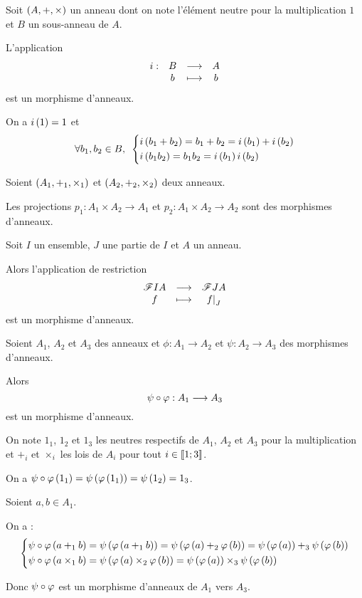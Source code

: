 \begin{prop}
Soit \(\anneau{A}\) un anneau dont on note l'élément neutre pour la multiplication \(1\) et \(B\) un sous-anneau de \(A\).

L'application \[\begin{array}[t]{cccc}i : & B & \longrightarrow & A \\ & b & \longmapsto & b\end{array}\] est un morphisme d'anneaux.
\end{prop}

\begin{dem}
On a \(i\left(1\right)=1\) et \[\quantifs{\forall b_1,b_2\in B}\begin{dcases}i\paren{b_1+b_2}=b_1+b_2=i\paren{b_1}+i\paren{b_2} \\ i\paren{b_1b_2}=b_1b_2=i\paren{b_1}i\paren{b_2}\end{dcases}\]
\end{dem}

\begin{ex}
Soient \(\anneau{A_1}[+_1][\times_1]\) et \(\anneau{A_2}[+_2][\times_2]\) deux anneaux.

Les projections \(p_1:A_1\times A_2\to A_1\) et \(p_2:A_1\times A_2\to A_2\) sont des morphismes d'anneaux.
\end{ex}

\begin{ex}
Soit \(I\) un ensemble, \(J\) une partie de \(I\) et \(A\) un anneau.

Alors l'application de restriction \[\fonctionlambda{\F{I}{A}}{\F{J}{A}}{f}{\restr{f}{J}}\] est un morphisme d'anneaux.
\end{ex}

\begin{prop}
Soient \(A_1\), \(A_2\) et \(A_3\) des anneaux et \(\phi:A_1\to A_2\) et \(\psi:A_2\to A_3\) des morphismes d'anneaux.

Alors \[\psi\circ\varphi:A_1\longrightarrow A_3\] est un morphisme d'anneaux.
\end{prop}

\begin{dem}
On note \(1_1\), \(1_2\) et \(1_3\) les neutres respectifs de \(A_1\), \(A_2\) et \(A_3\) pour la multiplication et \(+_i\) et \(\times_i\) les lois de \(A_i\) pour tout \(i\in\left\llbracket1;3\right\rrbracket\).

On a \(\psi\circ\varphi\left(1_1\right)=\psi\left(\varphi\left(1_1\right)\right)=\psi\left(1_2\right)=1_3\).

Soient \(a,b\in A_1\).

On a : \[\begin{dcases}\psi\circ\varphi\left(a+_1b\right)=\psi\left(\varphi\left(a+_1b\right)\right)=\psi\left(\varphi\left(a\right)+_2\varphi\left(b\right)\right)=\psi\left(\varphi\left(a\right)\right)+_3\psi\left(\varphi\left(b\right)\right) \\ \psi\circ\varphi\left(a\times_1b\right)=\psi\left(\varphi\left(a\right)\times_2\varphi\left(b\right)\right)=\psi\left(\varphi\left(a\right)\right)\times_3\psi\left(\varphi\left(b\right)\right)\end{dcases}\]

Donc \(\psi\circ\varphi\) est un morphisme d'anneaux de \(A_1\) vers \(A_3\).
\end{dem}

